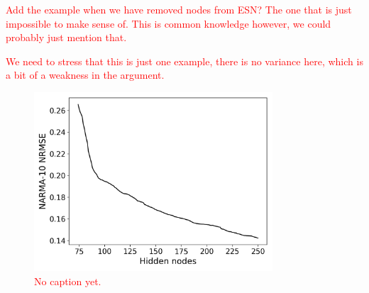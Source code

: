 \textcolor{red}{
  Add the example when we have removed nodes from ESN? The one that is just
impossible to make sense of. This is common knowledge however, we could probably
just mention that.
}

\textcolor{red}{
  We need to stress that this is just one example, there is no variance here,
which is a bit of a weakness in the argument.
}

\begin{figure}
  \centering
  \includegraphics[width=3.5in]{figures/grow-performance.png}
  \caption{
    \textcolor{red}{
      No caption yet.
    }
  }
  \label{fig:sq-grow-performance}
\end{figure}

